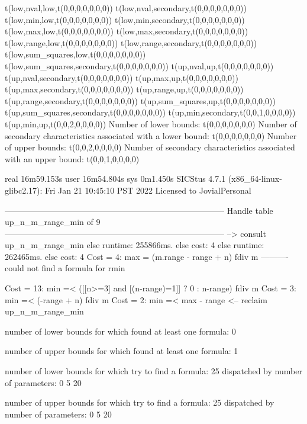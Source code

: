 t(low,nval,low,t(0,0,0,0,0,0,0))
t(low,nval,secondary,t(0,0,0,0,0,0,0))
t(low,min,low,t(0,0,0,0,0,0,0))
t(low,min,secondary,t(0,0,0,0,0,0,0))
t(low,max,low,t(0,0,0,0,0,0,0))
t(low,max,secondary,t(0,0,0,0,0,0,0))
t(low,range,low,t(0,0,0,0,0,0,0))
t(low,range,secondary,t(0,0,0,0,0,0,0))
t(low,sum_squares,low,t(0,0,0,0,0,0,0))
t(low,sum_squares,secondary,t(0,0,0,0,0,0,0))
t(up,nval,up,t(0,0,0,0,0,0,0))
t(up,nval,secondary,t(0,0,0,0,0,0,0))
t(up,max,up,t(0,0,0,0,0,0,0))
t(up,max,secondary,t(0,0,0,0,0,0,0))
t(up,range,up,t(0,0,0,0,0,0,0))
t(up,range,secondary,t(0,0,0,0,0,0,0))
t(up,sum_squares,up,t(0,0,0,0,0,0,0))
t(up,sum_squares,secondary,t(0,0,0,0,0,0,0))
t(up,min,secondary,t(0,0,1,0,0,0,0))
t(up,min,up,t(0,0,2,0,0,0,0))
Number of lower bounds:                                             t(0,0,0,0,0,0,0)
Number of secondary characteristics associated with a lower bound:  t(0,0,0,0,0,0,0)
Number of upper bounds:                                             t(0,0,2,0,0,0,0)
Number of secondary characteristics associated with an upper bound: t(0,0,1,0,0,0,0)

real	16m59.153s
user	16m54.804s
sys	0m1.450s
SICStus 4.7.1 (x86_64-linux-glibc2.17): Fri Jan 21 10:45:10 PST 2022
Licensed to JovialPersonal


--------------------------------------------------------------------------------
Handle table up_n_m_range_min of 9
--------------------------------------------------------------------------------
--> consult up_n_m_range_min
else runtime: 255866ms. else cost: 4
else runtime: 262465ms. else cost: 4
Cost =  4:  max  = (m.range - range + n) fdiv m %
----------
could not find a formula for rmin

Cost = 13:  min =< ([[n>=3] and [(n-range)=1]] ? 0 : n-range) fdiv m %
Cost =  3:  min =< (-range + n) fdiv m
Cost =  2:  min =< max - range
<-- reclaim up_n_m_range_min

number of lower bounds for which found at least one formula: 0

number of upper bounds for which found at least one formula: 1

number of lower bounds for which try to find a formula: 25
dispatched by number of parameters: 0  5  20

number of upper bounds for which try to find a formula: 25
dispatched by number of parameters: 0  5  20

